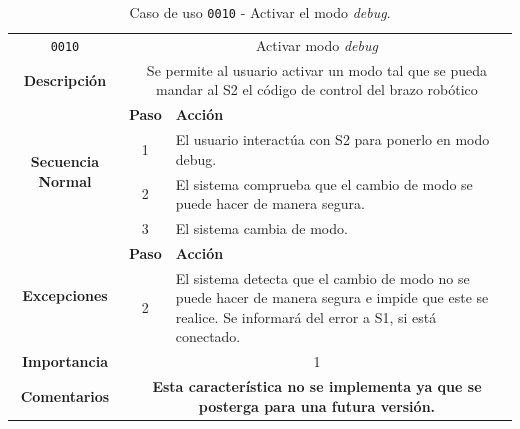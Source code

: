 \begin{table}[H]
    \centering
    \begin{tabularx}{\textwidth}{|c|c|X|}
        \cline{1-3}
        \texttt{0010}        & \multicolumn{2}{c|}{Activar modo \textit{debug}}                                      
        \\ \cline{1-3}
        \textbf{Descripción} & \multicolumn{2}{m{13cm}|}{Se permite al usuario activar un modo tal que se pueda mandar al \ac{S2} el código de control del brazo robótico}
        \\ \cline{1-3}
        \multirow{4}{*}{\textbf{Secuencia Normal}} & \textbf{Paso} & \textbf{Acción}
        \\ \cline{2-3}                    &   1  & El usuario interactúa con S2 para ponerlo en modo debug.
        \\ \cline{2-3}                    &   2  & El sistema comprueba que el cambio de modo se puede hacer de manera segura.
        \\ \cline{2-3}                    &   3  & El sistema cambia de modo.
        \\ \cline{1-3}
        \multirow{2}{*}{\textbf{Excepciones}} & \textbf{Paso} & \textbf{Acción}
        \\ \cline{2-3}                    &   2  & El sistema detecta que el cambio de modo no se puede hacer de manera segura e impide que este se realice. Se informará del error a \ac{S1}, si está conectado.
        \\ \cline{1-3}
        \textbf{Importancia}                 & \multicolumn{2}{c|}{1}           
        \\ \cline{1-3}
        \textbf{Comentarios}                 & \multicolumn{2}{m{13cm}|}{\textbf{Esta característica no se implementa ya que se posterga para una futura versión.}}
        \\ \cline{1-3}
    \end{tabularx}
    \caption{Caso de uso \texttt{0010} - Activar el modo \textit{debug}.}
    \label{tab:CU0010}
    \label{tab:caso_de_uso_activar_modo_debug}
\end{table}

